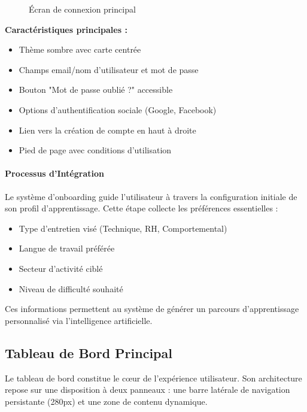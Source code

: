 \documentclass[12pt, a4paper]{report}
\begin{document}
\begin{figure}[H]
    \centering
    \caption{Écran de connexion principal}
    \label{fig:login}
\end{figure}

\noindent\textbf{Caractéristiques principales :}
\begin{itemize}
    \item Thème sombre avec carte centrée
    \item Champs email/nom d'utilisateur et mot de passe
    \item Bouton "Mot de passe oublié ?" accessible
    \item Options d'authentification sociale (Google, Facebook)
    \item Lien vers la création de compte en haut à droite
    \item Pied de page avec conditions d'utilisation
\end{itemize}

\paragraph{Processus d'Intégration}
Le système d'onboarding guide l'utilisateur à travers la configuration initiale de son profil d'apprentissage. Cette étape collecte les préférences essentielles :
\begin{itemize}
    \item Type d'entretien visé (Technique, RH, Comportemental)
    \item Langue de travail préférée
    \item Secteur d'activité ciblé
    \item Niveau de difficulté souhaité
\end{itemize}

Ces informations permettent au système de générer un parcours d'apprentissage personnalisé via l'intelligence artificielle.

\subsection{Tableau de Bord Principal}

Le tableau de bord constitue le cœur de l'expérience utilisateur. Son architecture repose sur une disposition à deux panneaux : une barre latérale de navigation persistante (280px) et une zone de contenu dynamique.
\end{document}
